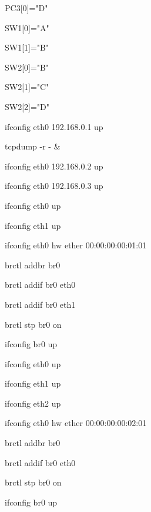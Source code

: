 \documentclass{article}
\begin{document}
PC3[0]="D"

SW1[0]="A"

SW1[1]="B"

SW2[0]="B"

SW2[1]="C"

SW2[2]="D"


ifconfig eth0 192.168.0.1 up


tcpdump -r - &


ifconfig eth0 192.168.0.2 up


ifconfig eth0 192.168.0.3 up


ifconfig eth0 up

ifconfig eth1 up

ifconfig eth0 hw ether 00:00:00:00:01:01

brctl addbr br0

brctl addif br0 eth0

brctl addif br0 eth1


brctl stp br0 on

ifconfig br0 up



ifconfig eth0 up

ifconfig eth1 up

ifconfig eth2 up

ifconfig eth0 hw ether 00:00:00:00:02:01

brctl addbr br0

brctl addif br0 eth0

brctl stp br0 on

ifconfig br0 up
\end{document}
